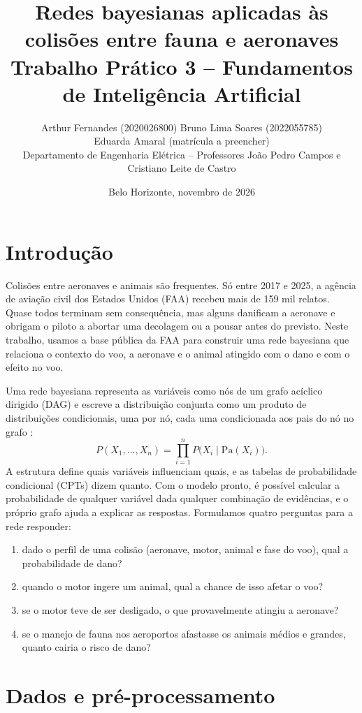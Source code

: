 \documentclass[10pt,a4paper,twocolumn]{article}
\title{\vspace{-1.2cm}\textbf{Redes bayesianas aplicadas às colisões entre fauna e aeronaves}\\[2pt]
\large Trabalho Prático 3 -- Fundamentos de Inteligência Artificial}
\author{Arthur Fernandes (2020026800) \quad Bruno Lima Soares (2022055785)\\ Eduarda Amaral (matrícula a preencher)\\[2pt]
\small Departamento de Engenharia Elétrica -- Professores João Pedro Campos e Cristiano Leite de Castro}
\date{\small Belo Horizonte, novembro de 2026}
\begin{document}
\maketitle

\section{Introdução}

Colisões entre aeronaves e animais são frequentes. Só entre 2017 e 2025, a agência de aviação civil dos Estados Unidos
(FAA) recebeu mais de 159 mil relatos. Quase todos terminam sem consequência, mas alguns danificam a aeronave e obrigam o
piloto a abortar uma decolagem ou a pousar antes do previsto. Neste trabalho, usamos a base pública da FAA
\citep{faa2026} para construir uma rede bayesiana que relaciona o contexto do voo, a aeronave e o animal atingido com o
dano e com o efeito no voo.

Uma rede bayesiana representa as variáveis como nós de um grafo acíclico dirigido (DAG) e escreve a distribuição
conjunta como um produto de distribuições condicionais, uma por nó, cada uma condicionada aos pais do nó no grafo
\citep{koller2009}:
\begin{equation}
P(X_1,\dots,X_n)=\prod_{i=1}^{n} P\big(X_i \mid \mathrm{Pa}(X_i)\big).
\label{eq:fatoracao}
\end{equation}
A estrutura define quais variáveis influenciam quais, e as tabelas de probabilidade condicional (CPTs) dizem quanto.
Com o modelo pronto, é possível calcular a probabilidade de qualquer variável dada qualquer combinação de evidências,
e o próprio grafo ajuda a explicar as respostas. Formulamos quatro perguntas para a rede responder:
\begin{enumerate}[label=\textbf{Q\arabic*.}]
\item dado o perfil de uma colisão (aeronave, motor, animal e fase do voo), qual a probabilidade de dano?
\item quando o motor ingere um animal, qual a chance de isso afetar o voo?
\item se o motor teve de ser desligado, o que provavelmente atingiu a aeronave?
\item se o manejo de fauna nos aeroportos afastasse os animais médios e grandes, quanto cairia o risco de dano?
\end{enumerate}

\section{Dados e pré-processamento}
\end{document}
